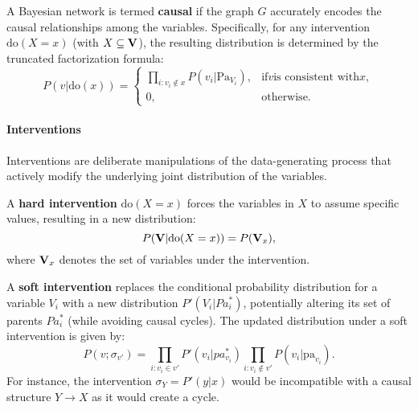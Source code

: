 \begin{remark}
	A Bayesian network is termed \textbf{causal} if the graph \(G\) accurately encodes the causal relationships among the variables. Specifically, for any intervention \(\text{do}(X = x)\) (with \(X \subseteq \mathbf{V}\)), the resulting distribution is determined by the truncated factorization formula:
	\begin{equation}
		P(v|\text{do}(x)) =
		\begin{cases}
			\prod_{i: v_i \notin x} P(v_i|\text{Pa}_{V_i}), & \text{if} v \text{is consistent with} x, \\
			0,                                              & \text{otherwise}.
		\end{cases}
	\end{equation}
\end{remark}

\paragraph{Interventions}

Interventions are deliberate manipulations of the data-generating process that actively modify the underlying joint distribution of the variables.

\begin{definition}
	A \textbf{hard intervention} \(\text{do}(X = x)\) forces the variables in \(X\) to assume specific values, resulting in a new distribution:
	\begin{equation}
		P(\mathbf{V}|\text{do}(X = x)) = P(\mathbf{V}_x),
	\end{equation}
	where \(\mathbf{V}_x\) denotes the set of variables under the intervention.
\end{definition}

\begin{definition}
	A \textbf{soft intervention} replaces the conditional probability distribution for a variable \(V_i\) with a new distribution \(P'(V_i|Pa^*_i)\), potentially altering its set of parents \(Pa^*_i\) (while avoiding causal cycles). The updated distribution under a soft intervention is given by:
	\begin{equation}
		P(v; \sigma_{v'}) = \prod_{i: v_i \in v'} P'(v_i|pa^*_{v_i}) \prod_{i: v_i \notin v'} P(v_i|\text{pa}_{v_i}).
	\end{equation}
	For instance, the intervention \(\sigma_Y = P'(y|x)\) would be incompatible with a causal structure \(Y \to X\) as it would create a cycle.
\end{definition}

